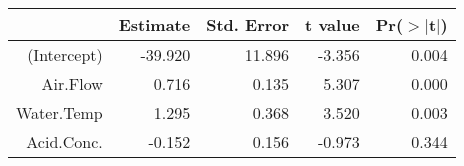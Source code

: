 \begin{table}[ht]
\centering
\begin{tabular}{rrrrr}
  \hline
 & Estimate & Std. Error & t value & Pr($>$$|$t$|$) \\ 
  \hline
(Intercept) & -39.920 & 11.896 & -3.356 & 0.004 \\ 
  Air.Flow & 0.716 & 0.135 & 5.307 & 0.000 \\ 
  Water.Temp & 1.295 & 0.368 & 3.520 & 0.003 \\ 
  Acid.Conc. & -0.152 & 0.156 & -0.973 & 0.344 \\ 
   \hline
\end{tabular}
\end{table}
